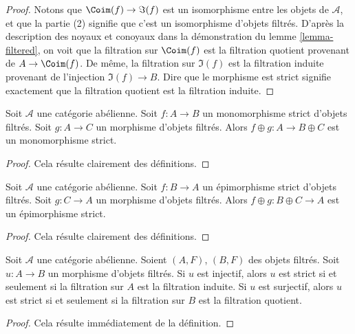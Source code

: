 \begin{proof}
Notons que $\Coim(f) \to \Im(f)$ est un isomorphisme entre les
objets de $\mathcal{A}$, et que la partie (2) signifie que c'est
un isomorphisme d'objets filtrés.
D'après la description des noyaux et conoyaux dans la démonstration du
lemme \ref{lemma-filtered},
on voit que la filtration sur $\Coim(f)$ est la
filtration quotient provenant de $A \to \Coim(f)$.
De même, la filtration sur $\Im(f)$ est la filtration
induite provenant de l'injection $\Im(f) \to B$.
Dire que le morphisme est strict signifie exactement que la filtration quotient
est la filtration induite.
\end{proof}

\begin{lemma}
\label{lemma-add-summand-strict-monomorphism}
Soit $\mathcal{A}$ une catégorie abélienne.
Soit $f : A \to B$ un monomorphisme strict d'objets filtrés.
Soit $g : A \to C$ un morphisme d'objets filtrés.
Alors $f \oplus g : A \to B \oplus C$ est un monomorphisme strict.
\end{lemma}

\begin{proof}
Cela résulte clairement des définitions.
\end{proof}

\begin{lemma}
\label{lemma-add-summand-strict-epimorphism}
Soit $\mathcal{A}$ une catégorie abélienne.
Soit $f : B \to A$ un épimorphisme strict d'objets filtrés.
Soit $g : C \to A$ un morphisme d'objets filtrés.
Alors $f \oplus g : B \oplus C \to A$ est un épimorphisme strict.
\end{lemma}

\begin{proof}
Cela résulte clairement des définitions.
\end{proof}

\begin{lemma}
\label{lemma-induced-and-quotient-strict}
Soit $\mathcal{A}$ une catégorie abélienne.
Soient $(A, F)$, $(B, F)$ des objets filtrés.
Soit $u : A \to B$ un morphisme d'objets filtrés.
Si $u$ est injectif, alors $u$ est strict si et seulement si la filtration
sur $A$ est la filtration induite.
Si $u$ est surjectif, alors $u$ est strict si et seulement si la filtration
sur $B$ est la filtration quotient.
\end{lemma}

\begin{proof}
Cela résulte immédiatement de la définition.
\end{proof}

